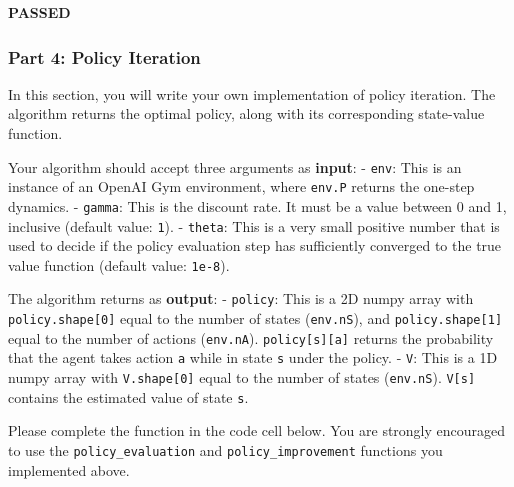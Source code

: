 \documentclass[11pt]{article}
\begin{document}
    \textbf{{PASSED}}

    
    \subsubsection{Part 4: Policy Iteration}\label{part-4-policy-iteration}

In this section, you will write your own implementation of policy
iteration. The algorithm returns the optimal policy, along with its
corresponding state-value function.

Your algorithm should accept three arguments as \textbf{input}: -
\texttt{env}: This is an instance of an OpenAI Gym environment, where
\texttt{env.P} returns the one-step dynamics. - \texttt{gamma}: This is
the discount rate. It must be a value between 0 and 1, inclusive
(default value: \texttt{1}). - \texttt{theta}: This is a very small
positive number that is used to decide if the policy evaluation step has
sufficiently converged to the true value function (default value:
\texttt{1e-8}).

The algorithm returns as \textbf{output}: - \texttt{policy}: This is a
2D numpy array with \texttt{policy.shape{[}0{]}} equal to the number of
states (\texttt{env.nS}), and \texttt{policy.shape{[}1{]}} equal to the
number of actions (\texttt{env.nA}). \texttt{policy{[}s{]}{[}a{]}}
returns the probability that the agent takes action \texttt{a} while in
state \texttt{s} under the policy. - \texttt{V}: This is a 1D numpy
array with \texttt{V.shape{[}0{]}} equal to the number of states
(\texttt{env.nS}). \texttt{V{[}s{]}} contains the estimated value of
state \texttt{s}.

Please complete the function in the code cell below. You are strongly
encouraged to use the \texttt{policy\_evaluation} and
\texttt{policy\_improvement} functions you implemented above.
\end{document}
